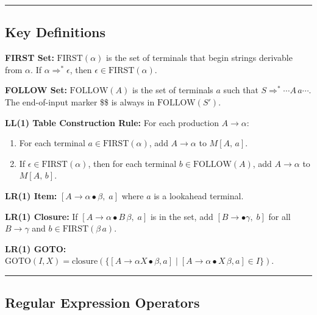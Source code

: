 \documentclass[12pt]{exam}
\begin{document}
\begin{questions}
\vspace{10cm}

\newpage


\noindent\rule{\textwidth}{0.4pt}

\subsection*{Key Definitions}

\noindent\textbf{FIRST Set:} $\text{FIRST}(\alpha)$ is the set of terminals that
begin strings derivable from $\alpha$.  If $\alpha \Rightarrow^* \epsilon$, then
$\epsilon \in \text{FIRST}(\alpha)$.

\medskip
\noindent\textbf{FOLLOW Set:} $\text{FOLLOW}(A)$ is the set of terminals $a$ such
that $S \Rightarrow^* \cdots A\,a\cdots$.  The end-of-input marker \$\$ is always
in $\text{FOLLOW}(S')$.

\medskip
\noindent\textbf{LL(1) Table Construction Rule:}
For each production $A \to \alpha$:
\begin{enumerate}[label=\alph*.]
  \item For each terminal $a \in \text{FIRST}(\alpha)$, add $A \to \alpha$ to
        $M[A,\,a]$.
  \item If $\epsilon \in \text{FIRST}(\alpha)$, then for each terminal
        $b \in \text{FOLLOW}(A)$, add $A \to \alpha$ to $M[A,\,b]$.
\end{enumerate}

\medskip
\noindent\textbf{LR(1) Item:} $[A \to \alpha \bullet \beta,\; a]$ where $a$ is
a lookahead terminal.

\medskip
\noindent\textbf{LR(1) Closure:} If $[A \to \alpha \bullet B\,\beta,\; a]$ is in
the set, add $[B \to \bullet\gamma,\; b]$ for all $B \to \gamma$ and
$b \in \text{FIRST}(\beta\,a)$.

\medskip
\noindent\textbf{LR(1) GOTO:} $\text{GOTO}(I, X) = \text{closure}(\{[A \to \alpha
X \bullet \beta, a] \mid [A \to \alpha \bullet X\,\beta, a] \in I\})$.

\medskip
\noindent\rule{\textwidth}{0.4pt}

\subsection*{Regular Expression Operators}


\end{questions}
\end{document}
